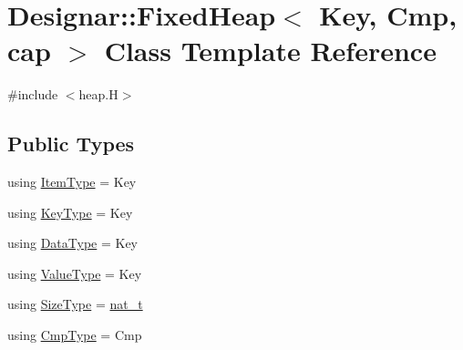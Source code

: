 \hypertarget{class_designar_1_1_fixed_heap}{}\section{Designar\+:\+:Fixed\+Heap$<$ Key, Cmp, cap $>$ Class Template Reference}
\label{class_designar_1_1_fixed_heap}


{\ttfamily \#include $<$heap.\+H$>$}

\subsection*{Public Types}
\begin{DoxyCompactItemize}
\item 
using \hyperlink{class_designar_1_1_fixed_heap_adf444211fa73830a09b3847ebe15bc9b}{Item\+Type} = Key
\item 
using \hyperlink{class_designar_1_1_fixed_heap_a2dbe3b22cba3e316803b614fba2d13e8}{Key\+Type} = Key
\item 
using \hyperlink{class_designar_1_1_fixed_heap_a48202f857a59e2753aa72625f0d90f94}{Data\+Type} = Key
\item 
using \hyperlink{class_designar_1_1_fixed_heap_a33def2622f3d95c165abf62ce2edcb73}{Value\+Type} = Key
\item 
using \hyperlink{class_designar_1_1_fixed_heap_a138d26dc24cbab61001f528a29b5154b}{Size\+Type} = \hyperlink{namespace_designar_aa72662848b9f4815e7bf31a7cf3e33d1}{nat\+\_\+t}
\item 
using \hyperlink{class_designar_1_1_fixed_heap_a0dab9096a5119723285ee3d4f1a4cee9}{Cmp\+Type} = Cmp
\end{DoxyCompactItemize}
